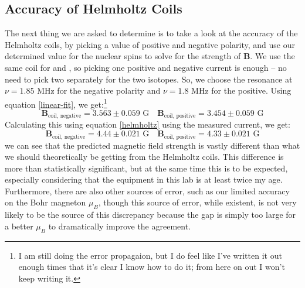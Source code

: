 \documentclass[10pt]{article}
\begin{document}
	\subsection{Accuracy of Helmholtz Coils}

	The next thing we are asked to determine is to take a look at the accuracy of the
	Helmholtz coils, by picking a value of positive and negative polarity, and use
	our determined value for the nuclear spins to solve for the strength of \(
	\mathbf{B}\). We use the same coil for  and , so picking
	one positive and negative current is enough -- no need to pick two separately for
	the two isotopes. So, we choose the resonance at \( \nu = 1.85 \) MHz for the
	negative polarity and \( \nu = 1.8 \) MHz for the positive. Using 
	equation \ref{linear-fit}, we get:\footnote{I am still doing the error
		propagaion, but I do feel like I've written it out enough times that it's
	clear I know how to do it; from here on out I won't keep writing it.}
	\[
		\mathbf{B}_\text{coil, negative} = 3.563 \pm 0.059 \text{ G}\quad 
		\mathbf{B}_{\text{coil, positive}} = 3.454 \pm 0.059 \text{ G}
	\]
	Calculating this using equation \ref{helmholtz} using the measured current, we
	get:
	\[
		\mathbf{B}_\text{coil, negative} = 4.44 \pm 0.021 \text{ G}\quad
		\mathbf{B}_\text{coil, positive} = 4.33 \pm 0.021 \text{ G}
	\]
	we can see that the predicted magnetic field strength is vastly different than
	what we should theoretically be getting from the Helmholtz coils. This difference
	is more than statistically significant, but at the same time this is to be
	expected, especially considering that the equipment in this lab is at least twice
	my age. Furthermore, there are also other sources of error, such as our limited
	accuracy on the Bohr magneton \( \mu_B \), though this source of error, while
	existent, is not very likely to be the source of this discrepancy because the gap
	is simply too large for a better \( \mu_B \) to dramatically improve the
	agreement. 
\end{document}
